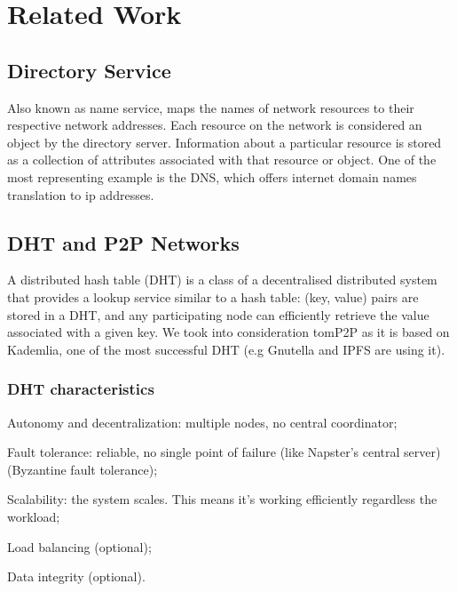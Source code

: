 \chapter{Related Work}
\label{chapter:related_work}

\section{Directory Service}
Also known as name service, maps the names of network resources to their respective network addresses. Each resource on the network is considered an object by the directory server. Information about a particular resource is stored as a collection of attributes associated with that resource or object. One of the most representing example is the DNS, which offers internet domain names translation to ip addresses.

\section{DHT and P2P Networks}
A distributed hash table (DHT) is a class of a decentralised distributed system that provides a lookup service similar to a hash table: (key, value) pairs are stored in a DHT, and any participating node can efficiently retrieve the value associated with a given key. We took into consideration tomP2P as it is based on Kademlia, one of the most successful DHT (e.g Gnutella and IPFS are using it). 

\subsection{DHT characteristics}
\begin{list}{}{}
\item {Autonomy and decentralization}: multiple nodes, no central coordinator;
\item {Fault tolerance}: reliable, no single point of failure (like Napster’s central server) (Byzantine fault tolerance);
\item {Scalability}: the system scales. This means it’s working efficiently regardless the workload;
\item {Load balancing} (optional);
\item {Data integrity} (optional).
\end{list}

